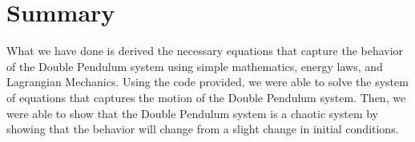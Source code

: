 \section{Summary}\label{sec:summary}
What we have done is derived the necessary equations that capture the behavior of the Double Pendulum system using simple mathematics, energy laws, and Lagrangian Mechanics. Using the code provided, we were able to solve the system of equations that captures the motion of the Double Pendulum system. Then, we were able to show that the Double Pendulum system is a chaotic system by showing that the behavior will change from a slight change in initial conditions.
